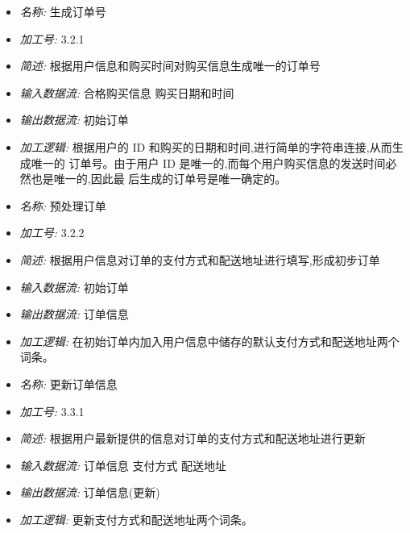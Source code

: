 \documentclass{article}
\begin{document}
\begin{CJK*}{UTF8}{gbsn}
\begin{itemize}
\end{itemize}


\vspace{-1mm}


\begin{itemize}
\item \textit{名称: }生成订单号
\item \textit{加工号: }3.2.1
\item \textit{简述: }根据用户信息和购买时间对购买信息生成唯一的订单号
\item \textit{输入数据流: }合格购买信息 购买日期和时间
\item \textit{输出数据流: }初始订单
\item \textit{加工逻辑: }根据用户的 ID 和购买的日期和时间,进行简单的字符串连接,从而生成唯一的 订单号。由于用户 ID 是唯一的,而每个用户购买信息的发送时间必然也是唯一的,因此最 后生成的订单号是唯一确定的。

\end{itemize}


\vspace{-1mm}


\begin{itemize}
\item \textit{名称: }预处理订单
\item \textit{加工号: }3.2.2 
\item \textit{简述: }根据用户信息对订单的支付方式和配送地址进行填写,形成初步订单 
\item \textit{输入数据流: }初始订单
\item \textit{输出数据流: }订单信息 
\item \textit{加工逻辑: }在初始订单内加入用户信息中储存的默认支付方式和配送地址两个词条。

\end{itemize}


\vspace{-1mm}


\begin{itemize}
\item \textit{名称: }更新订单信息
\item \textit{加工号: }3.3.1 
\item \textit{简述: }根据用户最新提供的信息对订单的支付方式和配送地址进行更新 
\item \textit{输入数据流: }订单信息 支付方式 配送地址 
\item \textit{输出数据流: }订单信息(更新) 
\item \textit{加工逻辑: }更新支付方式和配送地址两个词条。


\end{itemize}
\end{CJK*}
\end{document}
